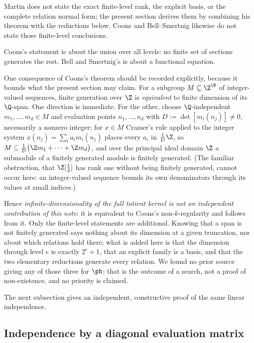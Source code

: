 Martin does not state the exact finite-level
rank, the explicit basis, or the complete relation normal form; the present
section derives them by combining his theorem with the reductions below.
Coons and Bell--Smertnig likewise do not state those finite-level conclusions.

Coons's statement is about the union over all levels: no finite set of sections
generates the rest.  Bell and Smertnig's is about a functional equation.

One consequence of Coons's theorem should be recorded explicitly, because it
bounds what the present section may claim.  For a subgroup $M\subseteq\Z^{\N}$
of integer-valued sequences, finite generation over $\Z$ is \emph{equivalent} to
finite dimension of its $\Q$-span.  One direction is immediate.  For the other,
choose $\Q$-independent $m_1,\dots,m_d\in M$ and evaluation points
$n_1,\dots,n_d$ with $D:=\det[m_i(n_j)]\neq0$, necessarily a nonzero integer;
for $x\in M$ Cramer's rule applied to the integer system
$x(n_j)=\sum_i a_im_i(n_j)$ places every $a_i$ in $\tfrac1D\Z$, so
$M\subseteq\tfrac1D\bigl(\Z m_1+\dots+\Z m_d\bigr)$, and over the principal
ideal domain $\Z$ a submodule of a finitely generated module is finitely
generated.  (The familiar obstruction, that $\Z[\tfrac12]$ has rank one without
being finitely generated, cannot occur here: an integer-valued sequence bounds
its own denominators through its values at small indices.)

Hence \emph{infinite-dimensionality of the full totient kernel is not an
independent contribution of this note}: it is equivalent to Coons's
non-$k$-regularity and follows from it.  Only the finite-level statements are
additional.  Knowing that a span is not finitely generated says nothing
about its dimension at a given truncation, nor about which relations hold
there; what is added here is that
the dimension through level $e$ is exactly $2^e+1$, that an explicit family is
a basis, and that the two elementary reductions generate every relation.  We
found no prior source giving any of those three for $\ph$; that is the outcome
of a search, not a proof of non-existence, and no priority is claimed.

The next subsection gives an independent, constructive proof of the same
linear independence.

\subsection{Independence by a diagonal evaluation matrix}

